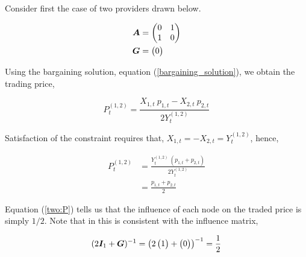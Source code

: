 Consider first the case of two providers drawn below.

\vspace{5mm}
\begin{minipage}{.5\textwidth}
  \resizebox{\textwidth}{!}{}
\end{minipage}
\begin{minipage}{.45\textwidth}
  \begin{equation*}
    \begin{split}
      \bm{A} &= \begin{pmatrix}
        0 & 1 \\
        1 & 0
      \end{pmatrix} \\
      \bm{G} &= \begin{pmatrix}
        0
      \end{pmatrix}
    \end{split}
  \end{equation*}
\end{minipage}
\vspace{5mm}

Using the bargaining solution, equation (\ref{bargaining_solution}), we obtain the trading price,

\begin{equation}
  P^{(1, 2)}_t = \frac{X_{1, t} \  p_{1, t} - X_{2, t} \  p_{2, t}}{2 Y^{(1, 2)}_t}
\end{equation}

Satisfaction of the constraint requires that, $X_{1, t} = - X_{2, t} = Y^{(1, 2)}_t$, hence,

\begin{equation} \label{two:P}
  \begin{split}
    P^{(1, 2)}_t &= \frac{Y^{(1, 2)}_t \  \left( p_{1, t} + p_{2, t} \right)}{2  Y^{(1, 2)}_t} \\
    &= \frac{p_{1, t} + p_{2, t}}{2}
  \end{split}
\end{equation}

Equation (\ref{two:P}) tells us that the influence of each node on the traded price is simply $1 / 2$. Note that in this is consistent with the influence matrix,

\begin{equation}
  (2 \bm{I}_{1} + \bm{G})^{-1} = \left( 2 \begin{pmatrix} 1 \end{pmatrix} + \begin{pmatrix} 0 \end{pmatrix} \right)^{-1} = \frac{1}{2}
\end{equation}

